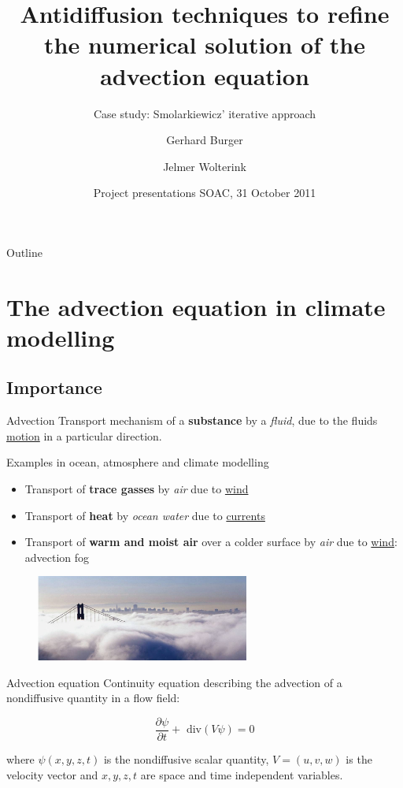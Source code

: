 \documentclass[hyperref={pdfstartview=Fit}]{beamer}
\title[Advection equation and antidiffusion]%
{Antidiffusion techniques to refine the numerical solution of the advection equation}
\subtitle{Case study: Smolarkiewicz' iterative approach}
\author[Burger, Wolterink]%
{Gerhard Burger \and Jelmer Wolterink}
\institute[Utrecht University]%
{
  Scientific Computing\\
  Department of Mathematics\\
  Utrecht University
}
\date[31-Oct-2011] %
{Project presentations SOAC, 31 October 2011}
\begin{document}
\begin{frame}
  \titlepage
\end{frame}

\begin{frame}{Outline}
  \tableofcontents
\end{frame}

\section{The advection equation in climate modelling}
\subsection{Importance}

\begin{frame}

\begin{block}{Advection}
Transport mechanism of a \textbf{substance} by a \textit{fluid}, due to the fluids \underline{motion} in a particular direction.
\end{block}

Examples in ocean, atmosphere and climate modelling

\begin{itemize}
   \item Transport of \textbf{trace gasses} by \textit{air} due to \underline{wind}
   \item Transport of \textbf{heat} by \textit{ocean water} due to \underline{currents}
   \item Transport of \textbf{warm and moist air} over a colder surface by \textit{air} due to \underline{wind}: advection fog
\end{itemize}

\begin{figure}
\includegraphics[width=7cm]{advfog.png}
\end{figure}

\end{frame}


\begin{frame}
\begin{block}{Advection equation}
Continuity equation describing the advection of a nondiffusive quantity in a flow field:

\begin{equation}
\frac{\partial \psi}{\partial t} + \text{ div}(V\psi) = 0
\end{equation}

where $\psi(x,y,z,t)$ is the nondiffusive scalar quantity, $V=(u,v,w)$ is the velocity vector and $x,y,z,t$ are space and time independent variables. 
\end{block}


\end{frame}
\end{document}
